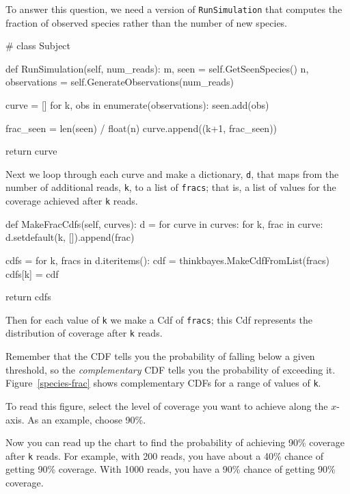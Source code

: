 \documentclass[12pt]{book}
\theoremstyle{exercise}
\newcommand{\py}[1]{{\tt #1}}%
\begin{document}
To answer this question, we need a version of \py{RunSimulation}
that computes the fraction of observed species rather than the
number of new species.

\begin{code}
# class Subject

    def RunSimulation(self, num_reads):
        m, seen = self.GetSeenSpecies()
        n, observations = self.GenerateObservations(num_reads)

        curve = []
        for k, obs in enumerate(observations):
            seen.add(obs)

            frac_seen = len(seen) / float(n)
            curve.append((k+1, frac_seen))

        return curve
\end{code}

Next we loop through each curve and make a dictionary, \py{d},
that maps from the number of additional reads, \py{k}, to
a list of \py{fracs}; that is, a list of values for the
coverage achieved after \py{k} reads.

\begin{code}
    def MakeFracCdfs(self, curves):
        d = {}
        for curve in curves:
            for k, frac in curve:
                d.setdefault(k, []).append(frac)

        cdfs = {}
        for k, fracs in d.iteritems():
            cdf = thinkbayes.MakeCdfFromList(fracs)
            cdfs[k] = cdf

        return cdfs
\end{code}

Then for each value of \py{k} we make a Cdf of \py{fracs}; this Cdf
represents the distribution of coverage after \py{k} reads.

Remember that the CDF tells you the probability of falling below a
given threshold, so the {\em complementary} CDF tells you the
probability of exceeding it.  Figure~\ref{species-frac} shows
complementary CDFs for a range of values of \py{k}.

To read this figure, select the level of coverage you want to achieve
along the $x$-axis.  As an example, choose 90\%.

Now you can read up the chart to find the probability of achieving
90\% coverage after \py{k} reads.  For example, with 200 reads,
you have about a 40\% chance of getting 90\% coverage.  With 1000 reads, you
have a 90\% chance of getting 90\% coverage.
\end{document}
